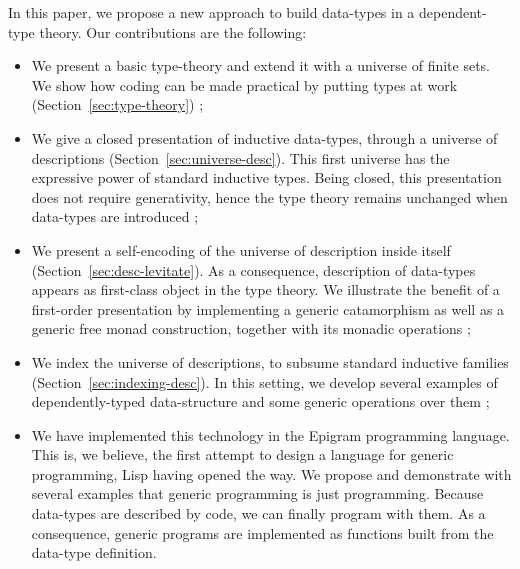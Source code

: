 \documentclass[preprint
              , authoryear
              ]{sigplanconf}
\begin{document}
In this paper, we propose a new approach to build data-types in a
dependent-type theory. Our contributions are the following:

\begin{itemize}
\item We present a basic type-theory and extend it with a universe of
  finite sets. We show how coding can be made practical by putting
  types at work (Section~\ref{sec:type-theory}) ;
\item We give a closed presentation of inductive data-types, through a
  universe of descriptions (Section~\ref{sec:universe-desc}). This
  first universe has the expressive power of standard inductive
  types. Being closed, this presentation does not require
  generativity, hence the type theory remains unchanged when
  data-types are introduced ;
\item We present a self-encoding of the universe of description inside
  itself (Section~\ref{sec:desc-levitate}). As a consequence,
  description of data-types appears as first-class object in the type
  theory. We illustrate the benefit of a first-order presentation by
  implementing a generic catamorphism as well as a generic free monad
  construction, together with its monadic operations ;
\item We index the universe of descriptions, to subsume standard
  inductive families (Section~\ref{sec:indexing-desc}). In this
  setting, we develop several examples of dependently-typed
  data-structure and some generic operations over them ;
\item We have implemented this technology in the Epigram programming
  language. This is, we believe, the first attempt to design a
  language for generic programming, Lisp having opened the way. We
  propose and demonstrate with several examples that generic
  programming is just programming. Because data-types are described by
  code, we can finally program with them. As a consequence, generic
  programs are implemented as functions built from the data-type
  definition.
\end{itemize}




\end{document}
